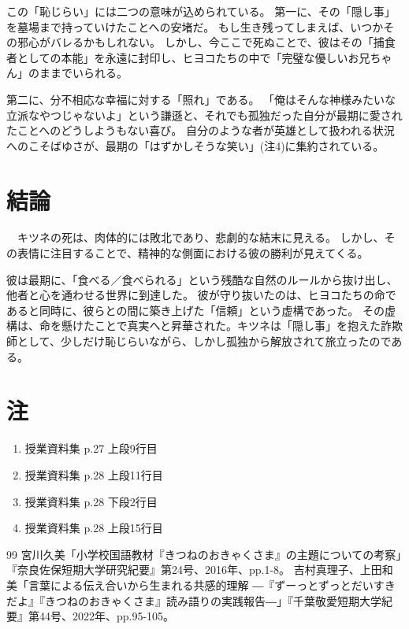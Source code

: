 \documentclass[a4paper,11pt]{ltjsarticle}
\begin{document}
この「恥じらい」には二つの意味が込められている。
第一に、その「隠し事」を墓場まで持っていけたことへの安堵だ。
もし生き残ってしまえば、いつかその邪心がバレるかもしれない。
しかし、今ここで死ぬことで、彼はその「捕食者としての本能」を永遠に封印し、ヒヨコたちの中で「完璧な優しいお兄ちゃん」のままでいられる。

第二に、分不相応な幸福に対する「照れ」である。
「俺はそんな神様みたいな立派なやつじゃないよ」という謙遜と、それでも孤独だった自分が最期に愛されたことへのどうしようもない喜び。
自分のような者が英雄として扱われる状況へのこそばゆさが、最期の「はずかしそうな笑い」(注4)に集約されている。

\section{結論}
　キツネの死は、肉体的には敗北であり、悲劇的な結末に見える。
しかし、その表情に注目することで、精神的な側面における彼の勝利が見えてくる。

彼は最期に、「食べる／食べられる」という残酷な自然のルールから抜け出し、他者と心を通わせる世界に到達した。
彼が守り抜いたのは、ヒヨコたちの命であると同時に、彼らとの間に築き上げた「信頼」という虚構であった。
その虚構は、命を懸けたことで真実へと昇華された。キツネは「隠し事」を抱えた詐欺師として、少しだけ恥じらいながら、しかし孤独から解放されて旅立ったのである。

\vspace{2em}

\section*{注}
\begin{enumerate}[nosep]
    \item[(注1)] 授業資料集 p.27 上段9行目
    \item[(注2)] 授業資料集 p.28 上段11行目
    \item[(注3)] 授業資料集 p.28 下段2行目
    \item[(注4)] 授業資料集 p.28 上段15行目
\end{enumerate}

\begin{thebibliography}{99}
     宮川久美「小学校国語教材『きつねのおきゃくさま』の主題についての考察」『奈良佐保短期大学研究紀要』第24号、2016年、pp.1-8。
     吉村真理子、上田和美「言葉による伝え合いから生まれる共感的理解 ―『ずーっとずっとだいすきだよ』『きつねのおきゃくさま』読み語りの実践報告―」『千葉敬愛短期大学紀要』第44号、2022年、pp.95-105。
\end{thebibliography}
\end{document}

